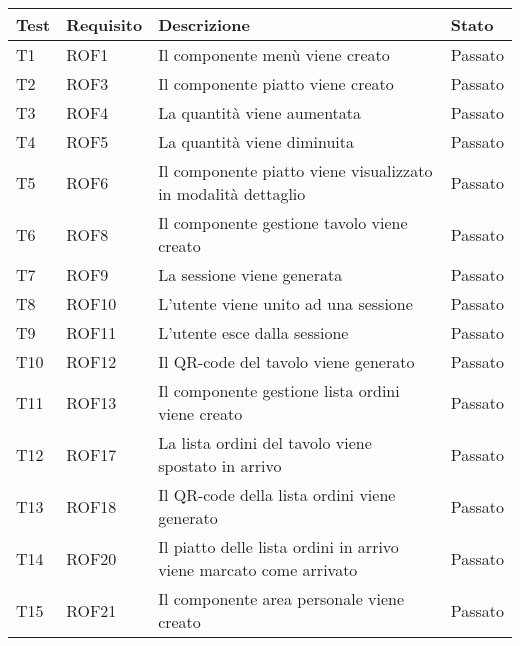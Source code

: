 \begin{center}
    \renewcommand{\arraystretch}{1.5}
    \begin{longtable}{ |p{1cm}|p{1.5cm}|p{9cm}|p{1.5cm}|  }
        \hline
        \hline
        Test&Requisito&Descrizione &Stato \\
        \hline
        \endhead
        T1&ROF1&Il componente menù viene creato&Passato \\
        T2&ROF3&Il componente piatto viene creato&Passato \\
        T3&ROF4&La quantità viene aumentata&Passato \\
        T4&ROF5&La quantità viene diminuita&Passato \\
        T5&ROF6&Il componente piatto viene visualizzato in modalità dettaglio&Passato \\
        T6&ROF8&Il componente gestione tavolo viene creato &Passato \\
        T7&ROF9&La sessione viene generata&Passato\\
        T8&ROF10&L'utente viene unito ad una sessione&Passato \\
        T9&ROF11&L'utente esce dalla sessione&Passato\\
        T10&ROF12&Il QR-code del tavolo viene generato&Passato\\
        T11&ROF13&Il componente gestione lista ordini viene creato&Passato\\
        T12&ROF17&La lista ordini del tavolo viene spostato in arrivo&Passato\\
        T13&ROF18&Il QR-code della lista ordini viene generato &Passato\\
        T14&ROF20&Il piatto delle lista ordini in arrivo viene marcato come arrivato&Passato\\
        T15&ROF21&Il componente area personale viene creato&Passato\\

\end{longtable}
\end{center}

